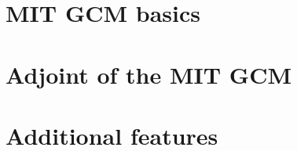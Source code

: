 \documentclass[12pt]{book}
\newcommand{\BIBPATH}{.}
\begin{document}
\tableofcontents
\pagebreak

\part{MIT GCM basics}


\pagebreak


\pagebreak


\pagebreak


\pagebreak


\part{Adjoint of the MIT GCM}


\pagebreak


\part{Additional features}


\pagebreak


\pagebreak


\pagebreak


\end{document}

